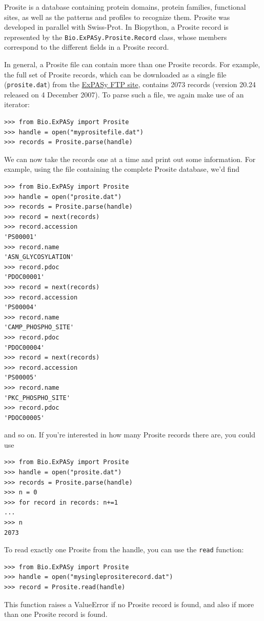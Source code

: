 \documentclass{report}
\begin{document}
Prosite is a database containing protein domains, protein families, functional sites, as well as the patterns and profiles to recognize them. Prosite was developed in parallel with Swiss-Prot. In Biopython, a Prosite record is represented by the \verb|Bio.ExPASy.Prosite.Record| class, whose members correspond to the different fields in a Prosite record.

In general, a Prosite file can contain more than one Prosite records. For example, the full set of Prosite records, which can be downloaded as a single file (\verb|prosite.dat|) from the \href{ftp://ftp.expasy.org/databases/prosite/prosite.dat}{ExPASy FTP site}, contains 2073 records (version 20.24 released on 4 December 2007). To parse such a file, we again make use of an iterator:

\begin{verbatim}
>>> from Bio.ExPASy import Prosite
>>> handle = open("myprositefile.dat")
>>> records = Prosite.parse(handle)
\end{verbatim}

We can now take the records one at a time and print out some information. For example, using the file containing the complete Prosite database, we'd find
\begin{verbatim}
>>> from Bio.ExPASy import Prosite
>>> handle = open("prosite.dat")
>>> records = Prosite.parse(handle)
>>> record = next(records)
>>> record.accession
'PS00001'
>>> record.name
'ASN_GLYCOSYLATION'
>>> record.pdoc
'PDOC00001'
>>> record = next(records)
>>> record.accession
'PS00004'
>>> record.name
'CAMP_PHOSPHO_SITE'
>>> record.pdoc
'PDOC00004'
>>> record = next(records)
>>> record.accession
'PS00005'
>>> record.name
'PKC_PHOSPHO_SITE'
>>> record.pdoc
'PDOC00005'
\end{verbatim}
and so on. If you're interested in how many Prosite records there are, you could use
\begin{verbatim}
>>> from Bio.ExPASy import Prosite
>>> handle = open("prosite.dat")
>>> records = Prosite.parse(handle)
>>> n = 0
>>> for record in records: n+=1
...
>>> n
2073
\end{verbatim}

To read exactly one Prosite from the handle, you can use the \verb|read| function:
\begin{verbatim}
>>> from Bio.ExPASy import Prosite
>>> handle = open("mysingleprositerecord.dat")
>>> record = Prosite.read(handle)
\end{verbatim}
This function raises a ValueError if no Prosite record is found, and also if more than one Prosite record is found.
\end{document}

